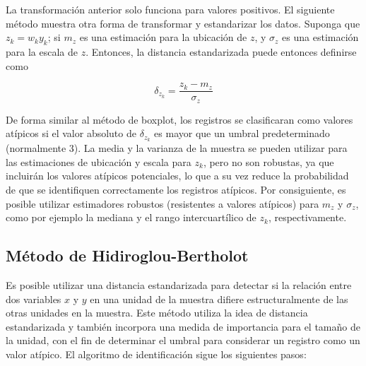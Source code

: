 \documentclass[
  12pt,
]{book}
\begin{document}
La transformación anterior solo funciona para valores positivos. El siguiente método muestra otra forma de transformar y estandarizar los datos. Suponga que \(z_k=w_ky_k\); si \(m_z\) es una estimación para la ubicación de \(z\), y \(\sigma_z\) es una estimación para la escala de \(z\). Entonces, la distancia estandarizada puede entonces definirse como

\[
\delta_{z_k}=\frac{z_k-m_z}{\sigma_z}
\]

De forma similar al método de boxplot, los registros se clasificaran como valores atípicos si el valor absoluto de \(\delta_{z_k}\) es mayor que un umbral predeterminado (normalmente 3). La media y la varianza de la muestra se pueden utilizar para las estimaciones de ubicación y escala para \(z_k\), pero no son robustas, ya que incluirán los valores atípicos potenciales, lo que a su vez reduce la probabilidad de que se identifiquen correctamente los registros atípicos. Por consiguiente, es posible utilizar estimadores robustos (resistentes a valores atípicos) para \(m_z\) y \(\sigma_z\), como por ejemplo la mediana y el rango intercuartílico de \(z_k\), respectivamente.

\hypertarget{muxe9todo-de-hidiroglou-bertholot}{%
\subsection{Método de Hidiroglou-Bertholot}\label{muxe9todo-de-hidiroglou-bertholot}}

Es posible utilizar una distancia estandarizada para detectar si la relación entre dos variables \(x\) y \(y\) en una unidad de la muestra difiere estructuralmente de las otras unidades en la muestra. Este método utiliza la idea de distancia estandarizada y también incorpora una medida de importancia para el tamaño de la unidad, con el fin de determinar el umbral para considerar un registro como un valor atípico. El algoritmo de identificación sigue los siguientes pasos:
\end{document}
